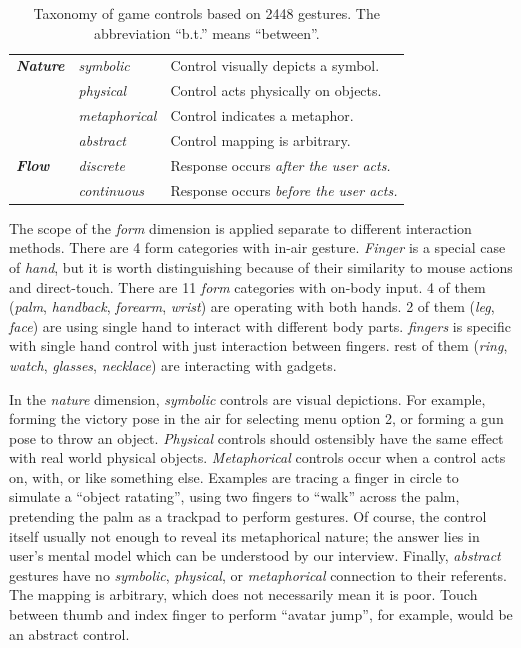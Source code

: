 \documentclass{sigchi}
\begin{document}
\begin{table}
\begin{adjustwidth}{-0.4cm}{}
\begin{tabular}{|l|l|l|}
      \Xhline{4\arrayrulewidth}
        \textbf{\em{Nature}} & \em{symbolic} & Control visually depicts a symbol.\\ \cline{2-3} 
             & \em{physical} & Control acts physically on objects.\\ \cline{2-3} 
             & \em{metaphorical} & Control indicates a metaphor.\\ \cline{2-3} 
             & \em{abstract} & Control mapping is arbitrary.\\
      \Xhline{4\arrayrulewidth}
        \textbf{\em{Flow}} & \em{discrete} & Response occurs \em{after} the user acts.\\ \cline{2-3} 
             & \em{continuous} & Response occurs \em{before} the user acts.\\
      \hline
    \end{tabular}
    \caption{Taxonomy of game controls based on 2448 gestures. The abbreviation ``b.t.'' means ``between''.}
    \label{tab:taxonomy}
    \end{adjustwidth}
  \end{table}

  The scope of the \emph{form} dimension is applied separate to different interaction methods. There are 4 form categories with in-air gesture. \emph{Finger} is a special case of \emph{hand}, but it is worth distinguishing because of their similarity to mouse actions and direct-touch. There are 11 \emph{form} categories with on-body input. 4 of them (\emph{palm}, \emph{handback}, \emph{forearm}, \emph{wrist}) are operating with both hands. 2 of them (\emph{leg}, \emph{face}) are using single hand to interact with different body parts. \emph{fingers} is specific with single hand control with just interaction between fingers. rest of them (\emph{ring}, \emph{watch}, \emph{glasses}, \emph{necklace}) are interacting with gadgets.


  In the \emph{nature} dimension, \emph{symbolic} controls are visual depictions. For example, forming the victory pose in the air for selecting menu option 2, or forming a gun pose to throw an object. \emph{Physical} controls should ostensibly have the same effect with real world physical objects. \emph{Metaphorical} controls occur when a control acts on, with, or like something else. Examples are tracing a finger in circle to simulate a ``object ratating'', using two fingers to ``walk'' across the palm, pretending the palm as a trackpad to perform gestures. Of course, the control itself usually not enough to reveal its metaphorical nature; the answer lies in user's mental model which can be understood by our interview. Finally, \emph{abstract} gestures have no \emph{symbolic}, \emph{physical}, or \emph{metaphorical} connection to their referents. The mapping is arbitrary, which does not necessarily mean it is poor. Touch between thumb and index finger to perform ``avatar jump'', for example, would be an abstract control.
\end{document}
